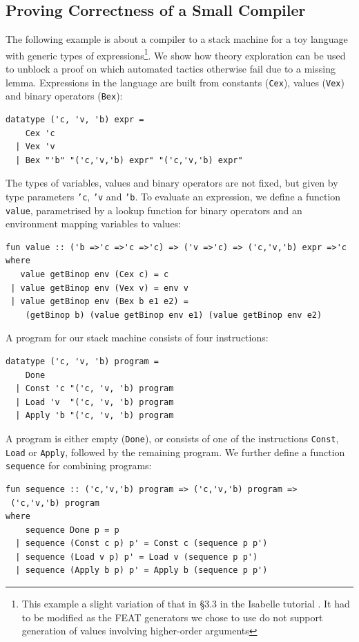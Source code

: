 \subsection{Proving Correctness of a Small Compiler}
\label{sec:comp-ex}
The following example is about a compiler to a stack machine for a toy language with generic types of expressions\footnote{This example a slight variation of that in \S3.3 in the Isabelle tutorial \cite{isabelle}. It had to be modified as the FEAT generators we chose to use do not support generation of values involving higher-order arguments}. We show how theory exploration can be used to unblock a proof on which automated tactics otherwise fail due to a missing lemma.
Expressions in the language are built from constants (\texttt{Cex}), values (\texttt{Vex}) and binary operators (\texttt{Bex}): 
\begin{small}
\begin{verbatim}
datatype ('c, 'v, 'b) expr =
    Cex 'c 
  | Vex 'v 
  | Bex "'b" "('c,'v,'b) expr" "('c,'v,'b) expr"
\end{verbatim}
\end{small}
The types of variables, values and binary operators are not fixed, but given by type parameters \texttt{'c}, \texttt{'v} and \texttt{'b}. 
To evaluate an expression, we define a function \texttt{value}, parametrised by a lookup function for binary operators and an environment mapping variables to values:
\begin{small}
\begin{verbatim}
fun value :: ('b =>'c =>'c =>'c) => ('v =>'c) => ('c,'v,'b) expr =>'c
where
   value getBinop env (Cex c) = c
 | value getBinop env (Vex v) = env v
 | value getBinop env (Bex b e1 e2) = 
    (getBinop b) (value getBinop env e1) (value getBinop env e2)
\end{verbatim}
\end{small}
A program for our stack machine consists of four instructions:
\begin{small}
\begin{verbatim}
datatype ('c, 'v, 'b) program =
    Done
  | Const 'c "('c, 'v, 'b) program
  | Load 'v  "('c, 'v, 'b) program
  | Apply 'b "('c, 'v, 'b) program
\end{verbatim}
\end{small}
A program is either empty (\texttt{Done}), or consists of one of the instructions \texttt{Const}, \texttt{Load} or \texttt{Apply}, followed by the remaining program. We further define a function \texttt{sequence} for combining programs:
\begin{small}
\begin{verbatim}
fun sequence :: ('c,'v,'b) program => ('c,'v,'b) program =>
 ('c,'v,'b) program
where
    sequence Done p = p
  | sequence (Const c p) p' = Const c (sequence p p')
  | sequence (Load v p) p' = Load v (sequence p p')
  | sequence (Apply b p) p' = Apply b (sequence p p')
\end{verbatim}
\end{small}
